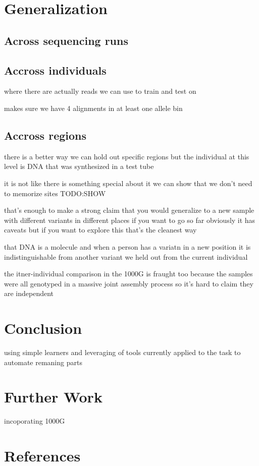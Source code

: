 \documentclass{article}
\begin{document}


\section{Generalization}

\subsection{Across sequencing runs}



\subsection{Accross individuals}
where there are actually reads we can use to train and test on


makes sure we have 4 alignments in at least one allele bin

\subsection{Accross regions}
there is a better way
we can hold out specific regions
but the individual
at this level
is DNA that was synthesized in a test tube

it is not like there is something special about it
we can show that we don't need to memorize sites
TODO:SHOW

that's enough to make a strong claim that you would generalize to a new sample with different variants in different places
if you want to go so far
obviously it has caveats but if you want to explore this that's the cleanest way

that DNA is a molecule and when a person has a variatn in a new position it is indistinguishable from another variant we held out from the current individual

the itner-individual comparison in the 1000G is fraught too
because the samples were all genotyped in a massive joint assembly process
so it's hard to claim they are independent

\section{Conclusion}

using simple learners and leveraging of tools currently applied to the task to automate remaning parts


\section{Further Work}
incoporating 1000G

\section*{References}
\small



\end{document}
